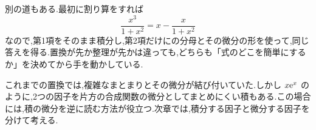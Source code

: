 別の道もある.最初に割り算をすれば
\[
 \frac{x^3}{1+x^2}=x-\frac{x}{1+x^2}
\]
なので,第1項をそのまま積分し,第2項だけにの分母とその微分の形を使って,同じ答えを得る.置換が先か整理が先かは違っても,どちらも「式のどこを簡単にするか」を決めてから手を動かしている.

これまでの置換では,複雑なまとまりとその微分が結び付いていた.しかし $x\mathrm{e}^x$ のように,2つの因子を片方の合成関数の微分としてまとめにくい積もある.この場合には,積の微分を逆に読む方法が役立つ.次章では,積分する因子と微分する因子を分けて考える.
